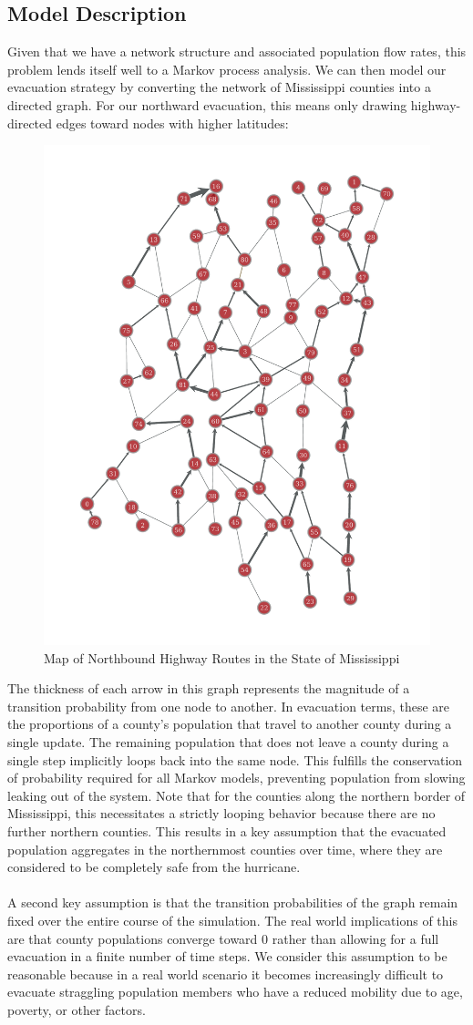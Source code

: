 \documentclass[titlepage]{article}
\begin{document}
  \subsection{Model Description}
    Given that we have a network structure and associated population flow rates, this problem lends itself well to a Markov process analysis. We can then model our evacuation strategy by converting the network of Mississippi counties into a directed graph. For our northward evacuation, this means only drawing highway-directed edges toward nodes with higher latitudes:
    \begin{figure}[H]
      \centering
      \includegraphics[width=.5\textwidth]{figures/full_directed_NS.pdf}
      \caption{Map of Northbound Highway Routes in the State of Mississippi \cite{ms_highways}}
    \end{figure}
    The thickness of each arrow in this graph represents the magnitude of a transition probability from one node to another. In evacuation terms, these are the proportions of a county's population that travel to another county during a single update. The remaining population that does not leave a county during a single step implicitly loops back into the same node. This fulfills the conservation of probability required for all Markov models, preventing population from slowing leaking out of the system. Note that for the counties along the northern border of Mississippi, this necessitates a strictly looping behavior because there are no further northern counties. This results in a key assumption that the evacuated population aggregates in the northernmost counties over time, where they are considered to be completely safe from the hurricane. \\
    \\
    A second key assumption is that the transition probabilities of the graph remain fixed over the entire course of the simulation. The real world implications of this are that county populations converge toward 0 rather than allowing for a full evacuation in a finite number of time steps. We consider this assumption to be reasonable because in a real world scenario it becomes increasingly difficult to evacuate straggling population members who have a reduced mobility due to age, poverty, or other factors. \\
\end{document}
